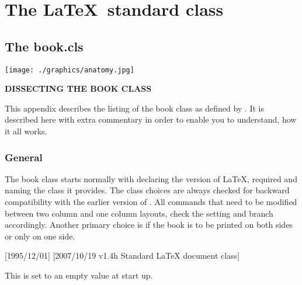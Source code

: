\part{The \LaTeX\ standard class}
\parindent0pt
\setlength\columnsep{2em}
\def\Paragraph#1{{\bf #1}\quad}
\chapter{The book.cls}

\clearpage

\texttt{[image: ./graphics/anatomy.jpg]}

\vspace{2\baselineskip}

\textbf{\Large DISSECTING THE BOOK CLASS}

\begin{multicols}{2}
This appendix describes the listing of the book class as defined by \latex. It is described here with extra commentary in order to enable you to understand, how it all works.

\lipsum[1-3]
\end{multicols}

\section{General}


The book class starts normally with declaring the version of LaTeX, required
and naming the class it provides. The class choices are always checked for backward compatibility with the earlier version of \latex. All commands that need to be modified between two column and one column layouts, check the setting and branch accordingly. Another primary choice is if the book is to be printed on both sides or only on one side.


\begin{teX}
[1995/12/01]
              [2007/10/19 v1.4h
 Standard LaTeX document class]
\end{teX}

{}\vskip0pt
This is set to an empty value at start up.

\begin{teX}
\newcommand\@ptsize{}
\newif\if@restonecol
\newif\if@titlepage \@titlepagetrue
\newif\if@openright
\newif\if@mainmatter \@mainmattertrue
\end{teX}


